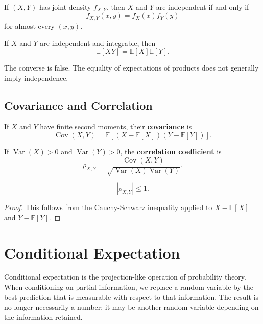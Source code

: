\begin{proposition}
If $(X,Y)$ has joint density $f_{X,Y}$, then $X$ and $Y$ are independent if and only if
\[
    f_{X,Y}(x,y)=f_X(x)f_Y(y)
\]
for almost every $(x,y)$.
\end{proposition}

\begin{proposition}
If $X$ and $Y$ are independent and integrable, then
\[
    \mathbb{E}[XY]=\mathbb{E}[X]\mathbb{E}[Y].
\]
\end{proposition}

\begin{remark}
The converse is false. The equality of expectations of products does not generally imply independence.
\end{remark}

\subsection{Covariance and Correlation}

\begin{definition}[Covariance]
If $X$ and $Y$ have finite second moments, their \textbf{covariance} is
\[
    \operatorname{Cov}(X,Y)=\mathbb{E}[(X-\mathbb{E}[X])(Y-\mathbb{E}[Y])].
\]
\end{definition}

\begin{definition}[Correlation]
If $\operatorname{Var}(X)>0$ and $\operatorname{Var}(Y)>0$, the \textbf{correlation coefficient} is
\[
    \rho_{X,Y}=\frac{\operatorname{Cov}(X,Y)}{\sqrt{\operatorname{Var}(X)\operatorname{Var}(Y)}}.
\]
\end{definition}

\begin{proposition}
\[
    |\rho_{X,Y}|\leq 1.
\]
\end{proposition}

\begin{proof}
This follows from the Cauchy-Schwarz inequality applied to $X-\mathbb{E}[X]$ and $Y-\mathbb{E}[Y]$.
\end{proof}

\section{Conditional Expectation}


Conditional expectation is the projection-like operation of probability theory. When conditioning on partial information, we replace a random variable by the best prediction that is measurable with respect to that information. The result is no longer necessarily a number; it may be another random variable depending on the information retained.

